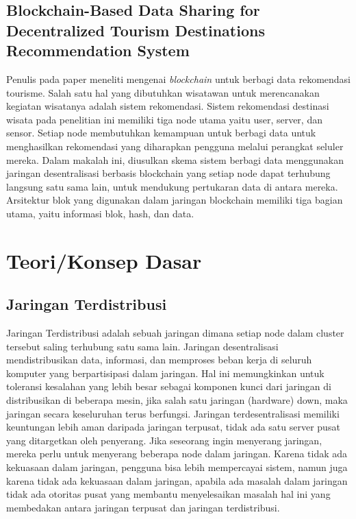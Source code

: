 \subsection{Blockchain-Based Data Sharing for Decentralized Tourism Destinations Recommendation System}
Penulis pada paper \parencite{hariadi2020} meneliti mengenai \emph{blockchain} untuk berbagi data rekomendasi tourisme.
Salah satu hal yang dibutuhkan wisatawan untuk merencanakan kegiatan wisatanya adalah sistem rekomendasi.
Sistem rekomendasi destinasi wisata pada penelitian ini memiliki tiga node utama yaitu user, server, dan sensor.
Setiap node membutuhkan kemampuan untuk berbagi data untuk menghasilkan rekomendasi yang diharapkan pengguna melalui perangkat seluler mereka.
Dalam makalah ini, diusulkan skema sistem berbagi data menggunakan jaringan desentralisasi berbasis blockchain yang setiap node dapat terhubung langsung satu sama lain, untuk mendukung pertukaran data di antara mereka. Arsitektur blok yang digunakan dalam jaringan blockchain memiliki tiga bagian utama, yaitu informasi blok, hash, dan data.

\section{Teori/Konsep Dasar}

\subsection{Jaringan Terdistribusi}

Jaringan Terdistribusi adalah sebuah jaringan dimana setiap
node dalam cluster tersebut saling terhubung satu sama lain.
Jaringan desentralisasi mendistribusikan data, informasi, dan
memproses beban kerja di seluruh komputer yang berpartisipasi dalam
jaringan. Hal ini memungkinkan untuk toleransi kesalahan yang
lebih besar sebagai komponen kunci dari jaringan di distribusikan
di beberapa mesin, jika salah satu jaringan (hardware) down, maka
jaringan secara keseluruhan terus berfungsi.
Jaringan terdesentralisasi memiliki keuntungan lebih aman
daripada jaringan terpusat, tidak ada satu server pusat yang
ditargetkan oleh penyerang. Jika seseorang ingin menyerang jaringan, mereka
perlu untuk menyerang beberapa node dalam jaringan. Karena
tidak ada kekuasaan dalam jaringan, pengguna bisa lebih
mempercayai sistem, namun juga karena tidak ada kekuasaan dalam jaringan,
apabila ada masalah dalam jaringan tidak ada otoritas pusat yang
membantu menyelesaikan masalah hal ini yang membedakan
antara jaringan terpusat dan jaringan terdistribusi.

